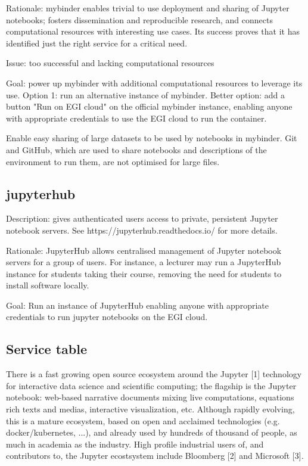 Rationale: mybinder enables trivial to use deployment and sharing of
Jupyter notebooks; fosters dissemination and reproducible research,
and connects computational resources with interesting use cases.
Its success proves that it has identified just the right service for
a critical need.

Issue: too successful and lacking computational resources

Goal: power up mybinder with additional computational resources to
leverage its use. Option 1: run an alternative instance of mybinder.
Better option: add a button "Run on EGI cloud" on the official
mybinder instance, enabling anyone with appropriate credentials to use
the EGI cloud to run the container.

Enable easy sharing of large datasets to be used by notebooks in mybinder. Git
and GitHub, which are used to share notebooks and descriptions of the
environment to run them, are not optimised for large files.

\subsection{jupyterhub}

Description: gives authenticated users access to private, persistent Jupyter
notebook servers. See https://jupyterhub.readthedocs.io/ for more details.

Rationale: JupyterHub allows centralised management of Jupyter notebook servers
for a group of users. For instance, a lecturer may run a JupyterHub instance for
students taking their course, removing the need for students to install software
locally.

Goal: Run an instance of JupyterHub enabling anyone with appropriate
credentials to run jupyter notebooks on the EGI cloud.

\subsection{Service table}

There is a fast growing open source ecosystem around the
Jupyter [1] technology for interactive data science and scientific computing;
the flagship is the Jupyter notebook: web-based narrative documents mixing live
computations, equations rich texts and medias, interactive visualization, etc.
Although rapidly evolving, this is a mature ecosystem, based on open
and acclaimed technologies (e.g. docker/kubernetes, ...), and already used
by hundreds of thousand of people, as much in academia as the industry.
High profile industrial users of, and contributors to, the Jupyter ecostsystem
include Bloomberg [2] and Microsoft [3].


